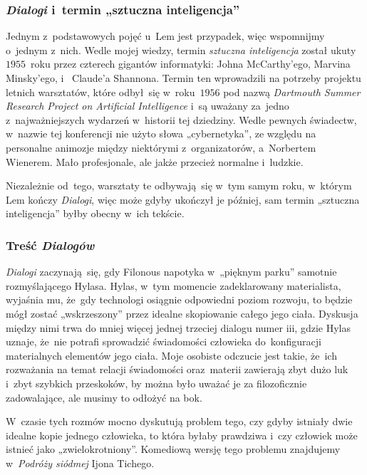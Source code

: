 \documentclass[10pt,t]{beamer}
\begin{document}
\begin{frame}
  \frametitle{\textit{Dialogi} i~termin „sztuczna
    inteligencja”}


  Jednym z~podstawowych pojęć u~Lem jest przypadek, więc wspomnijmy o~jednym
  z~nich. Wedle mojej wiedzy, termin \textit{sztuczna inteligencja} został
  ukuty $1955$~roku przez czterech gigantów informatyki:
  {Johna McCarthy’ego},
  {Marvina Minsky’ego},
  i~
  {Claude’a Shannona}. Termin ten wprowadzili na potrzeby projektu letnich
  warsztatów, które odbył~się w~roku~$1956$ pod nazwą
  {\textit{Dartmouth Summer Research Project on Artificial Intelligence}}
  i~są uważany za~jedno z~najważniejszych wydarzeń w~historii tej
  dziedziny. Wedle pewnych świadectw, w~nazwie tej konferencji nie użyto
  słowa „cybernetyka”, ze względu na personalne animozje między niektórymi
  z~organizatorów, a~Norbertem Wienerem. Mało profesjonale, ale jakże
  przecież normalne i~ludzkie.

  Niezależnie od~tego, warsztaty te odbywają~się w~tym samym roku, w~którym
  Lem kończy \textit{Dialogi}, więc może gdyby ukończył je później,
  sam termin „sztuczna inteligencja” byłby obecny w~ich tekście.

\end{frame}





\begin{frame}
  \frametitle{Treść \textit{Dialogów}}


  \textit{Dialogi} zaczynają~się, gdy Filonous napotyka w~„pięknym parku”
  samotnie rozmyślającego Hylasa. Hylas, w~tym momencie zadeklarowany
  materialista, wyjaśnia mu, że~gdy technologi osiągnie odpowiedni
  poziom rozwoju, to będzie mógł zostać „wskrzeszony” przez idealne
  skopiowanie całego jego ciała. Dyskusja między nimi trwa do mniej więcej
  jednej trzeciej dialogu numer iii, gdzie Hylas uznaje, że~nie potrafi
  sprowadzić świadomości człowieka do~konfiguracji materialnych elementów
  jego ciała. Moje osobiste odczucie jest takie, że~ich rozważania na temat
  relacji świadomości oraz~materii zawierają zbyt dużo luk i~zbyt szybkich
  przeskoków, by można było uważać je za filozoficznie zadowalające, ale
  musimy to odłożyć na bok.

  W~czasie tych rozmów mocno dyskutują problem tego, czy gdyby istniały
  dwie idealne kopie jednego człowieka, to która byłaby prawdziwa
  i~czy człowiek może istnieć jako „zwielokrotniony”. Komediową wersję
  tego problemu znajdujemy w~\textit{Podróży siódmej} Ijona Tichego.

\end{frame}
\end{document}
